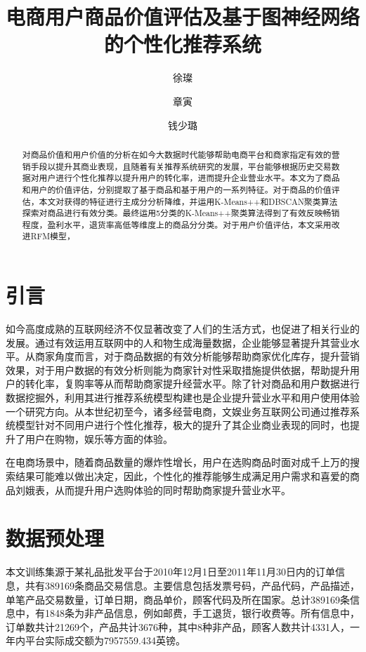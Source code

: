 \documentclass[lang=cn,11pt,a4paper,cite=authoryear]{elegantpaper}
\title{电商用户商品价值评估及基于图神经网络的个性化推荐系统}
\author{徐璨 \and 章寅 \and 钱少璐}
\institute{浙江工商大学}
\date{\zhtoday}
\begin{document}
\maketitle

\begin{abstract}
  对商品价值和用户价值的分析在如今大数据时代能够帮助电商平台和商家指定有效的营销手段以提升其商业表现，且随着有关推荐系统研究的发展，平台能够根据历史交易数据对用户进行个性化推荐以提升用户的转化率，进而提升企业营业水平。本文为了商品和用户的价值评估，分别提取了基于商品和基于用户的一系列特征。对于商品的价值评估，本文对获得的特征进行主成分分析降维，并运用K-Means++和DBSCAN聚类算法探索对商品进行有效分类。最终运用5分类的K-Means++聚类算法得到了有效反映畅销程度，盈利水平，退货率高低等维度上的商品分分类。对于用户价值评估，本文采用改进RFM模型，
\end{abstract}


\section{引言}

如今高度成熟的互联网经济不仅显著改变了人们的生活方式，也促进了相关行业的发展。通过有效运用互联网中的人和物生成海量数据，企业能够显著提升其营业水平。从商家角度而言，对于商品数据的有效分析能够帮助商家优化库存，提升营销效果，对于用户数据的有效分析则能为商家针对性采取措施提供依据，帮助提升用户的转化率，复购率等从而帮助商家提升经营水平。除了针对商品和用户数据进行数据挖掘外，利用其进行推荐系统模型构建也是企业提升营业水平和用户使用体验一个研究方向。从本世纪初至今，诸多经营电商，文娱业务互联网公司通过推荐系统模型针对不同用户进行个性化推荐，极大的提升了其企业商业表现的同时，也提升了用户在购物，娱乐等方面的体验。

在电商场景中，随着商品数量的爆炸性增长，用户在选购商品时面对成千上万的搜索结果可能难以做出决定，因此，个性化的推荐能够生成满足用户需求和喜爱的商品刘娥表，从而提升用户选购体验的同时帮助商家提升营业水平。

\section{数据预处理}

本文训练集源于某礼品批发平台于2010年12月1日至2011年11月30日内的订单信息，共有389169条商品交易信息。主要信息包括发票号码，产品代码，产品描述，单笔产品交易数量，订单日期，商品单价，顾客代码及所在国家。总计389169条信息中，有1848条为非产品信息，例如邮费，手工退货，银行收费等。所有信息中，订单数共计21269个，产品共计3676种，其中8种非产品，顾客人数共计4331人，一年内平台实际成交额为7957559.434英镑。
\end{document}
